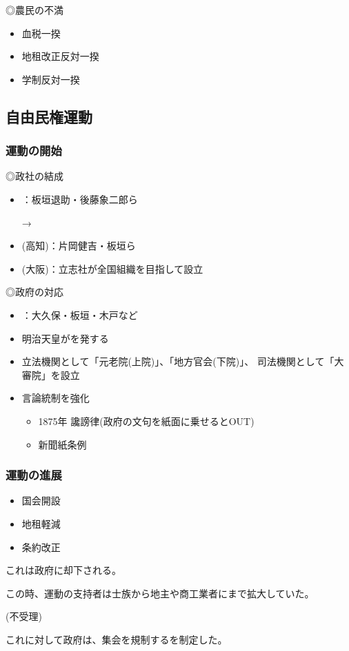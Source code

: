 \documentclass[12pt]{ltjsarticle}
\begin{document}
◎農民の不満
\begin{itemize}
\item 血税一揆
\item 地租改正反対一揆
\item 学制反対一揆
\end{itemize}

\subsection{自由民権運動}
\subsubsection{運動の開始}
◎政社の結成
\begin{itemize}
\item {}：板垣退助・後藤象二郎ら

→
\item {}(高知)：片岡健吉・板垣ら
\item {}(大阪)：立志社が全国組織を目指して設立
\end{itemize}
◎政府の対応
\begin{itemize}
\item {}：大久保・板垣・木戸など
\item 明治天皇がを発する
\item 立法機関として「元老院(上院)」、「地方官会(下院)」、
司法機関として「大審院」を設立
\item 言論統制を強化
\begin{itemize}
\item 1875年 讒謗律(政府の文句を紙面に乗せるとOUT)
\item 新聞紙条例
\end{itemize}
\end{itemize}

\subsubsection{運動の進展}
\begin{itemize}
\item 国会開設
\item 地租軽減
\item 条約改正
\end{itemize}
これは政府に却下される。

この時、運動の支持者は士族から地主や商工業者にまで拡大していた。

(不受理)

これに対して政府は、集会を規制するを制定した。
\end{document}

